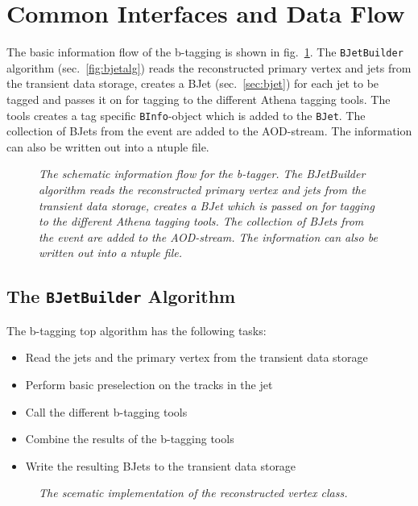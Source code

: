 \documentclass[a4paper,12pt]{article}
\begin{document}
\section{Common Interfaces and Data Flow}\label{interfaces}
The basic information flow of the b-tagging is shown in 
fig.~\ref{fig:infoflow}. The {\tt BJetBuilder} algorithm 
(sec.~\ref{fig:bjetalg}) reads the reconstructed primary vertex and jets 
from the transient data storage, creates a BJet (sec.~\ref{sec:bjet}) for
each jet to be tagged and
passes it on for tagging to the different Athena tagging tools.
The tools creates a tag specific {\tt BInfo}-object which is added to the
{\tt BJet}. The collection of BJets from the event are added to the 
AOD-stream. The information can also be written out into a ntuple file.

\begin{figure}[htbp]
  \centerline{}
  \caption[]{\label{fig:infoflow}\sl
    The schematic information flow for the b-tagger. The BJetBuilder algorithm
    reads the reconstructed primary vertex and jets from the transient data 
    storage, creates a BJet which is passed on for tagging to the different 
    Athena tagging tools. The collection of BJets from the event are added to
    the AOD-stream. The information can also be written out into a ntuple file.}
\end{figure}

\subsection{The {\tt BJetBuilder} Algorithm}\label{sec:bjetalg}
The b-tagging top algorithm has the following tasks:
\begin{itemize}
  \item Read the jets and the primary vertex from the transient data storage
  \item Perform basic preselection on the tracks in the jet
  \item Call the different b-tagging tools
  \item Combine the results of the b-tagging tools
  \item Write the resulting BJets to the transient data storage
\end{itemize}

\begin{figure}[htbp]
  \centerline{}
  \caption[]{\label{fig:btagbasic}\sl
    The scematic implementation of the reconstructed vertex class.}
\end{figure}
\end{document}
